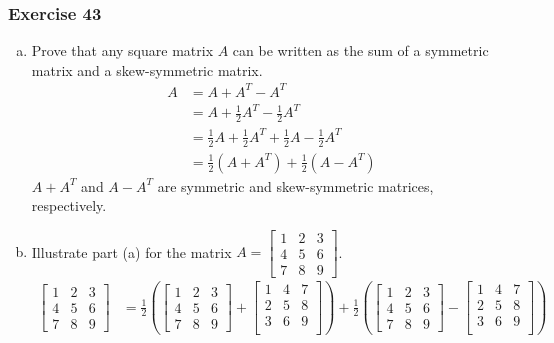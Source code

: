 \documentclass{math}
\begin{document}
\subsubsection*{Exercise 43}
\begin{enumerate}[(a)]
  \item Prove that any square matrix \( A \) can be written as the sum of a
  symmetric matrix and a skew-symmetric matrix.
  \begin{align*}
    A &= A+A^T-A^T \\
    &= A+\frac{1}{2}A^T-\frac{1}{2}A^T \\
    &= \frac{1}{2}A+\frac{1}{2}A^T+\frac{1}{2}A-\frac{1}{2}A^T \\
    &= \frac{1}{2}(A+A^T)+\frac{1}{2}(A-A^T)
  \end{align*}
  \( A+A^T \) and \( A-A^T \) are symmetric and skew-symmetric matrices,
  respectively.
  \item Illustrate part (a) for the matrix \( A = \begin{bmatrix}1 & 2 & 3 \\
  4 & 5 & 6 \\ 7 & 8 & 9\end{bmatrix} \).
  \begin{align*}
    \begin{bmatrix}
      1 & 2 & 3 \\
      4 & 5 & 6 \\
      7 & 8 & 9
    \end{bmatrix} &= \frac{1}{2}\left(\begin{bmatrix}
      1 & 2 & 3 \\
      4 & 5 & 6 \\
      7 & 8 & 9
    \end{bmatrix}+\begin{bmatrix}
      1 & 4 & 7 \\
      2 & 5 & 8 \\
      3 & 6 & 9 \\
    \end{bmatrix}\right)+\frac{1}{2}\left(\begin{bmatrix}
      1 & 2 & 3 \\
      4 & 5 & 6 \\
      7 & 8 & 9
    \end{bmatrix}-\begin{bmatrix}
      1 & 4 & 7 \\
      2 & 5 & 8 \\
      3 & 6 & 9 \\
    \end{bmatrix}\right)
  \end{align*}
\end{enumerate}
\end{document}
